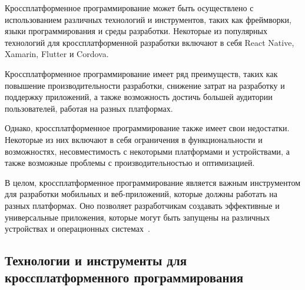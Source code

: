 Кроссплатформенное программирование может быть осуществлено с использованием различных технологий и инструментов, таких как фреймворки, языки программирования и среды разработки. Некоторые из популярных технологий для кроссплатформенной разработки включают в себя React Native, Xamarin, Flutter и Cordova.

Кроссплатформенное программирование имеет ряд преимуществ, таких как повышение производительности разработки, снижение затрат на разработку и поддержку приложений, а также возможность достичь большей аудитории пользователей, работая на разных платформах.

Однако, кроссплатформенное программирование также имеет свои недостатки. Некоторые из них включают в себя ограничения в функциональности и возможностях, несовместимость с некоторыми платформами и устройствами, а также возможные проблемы с производительностью и оптимизацией.

В целом, кроссплатформенное программирование является важным инструментом для разработки мобильных и веб-приложений, которые должны работать на разных платформах. Оно позволяет разработчикам создавать эффективные и универсальные приложения, которые могут быть запущены на различных устройствах и операционных системах~\cite{wikiRUCrossplatform}.

\subsection{\label{subsec:ch01/sec02/sub02}Технологии и инструменты для кроссплатформенного программирования}


